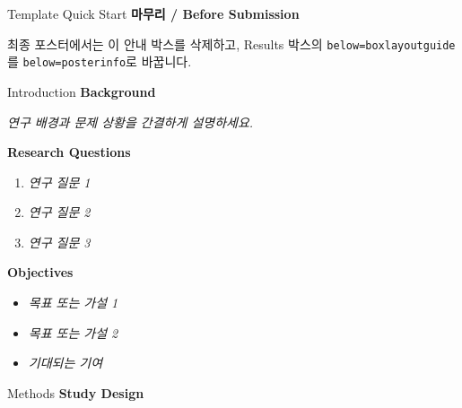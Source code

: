 \documentclass[a0paper,portrait]{KNUE_baposter}
\newcommand{\TemplateText}[1]{{\color{aaublue2}\itshape #1}}
\begin{document}
\begin{poster}
\begin{posterbox}[name=boxlayoutguide,column=1,below=posterinfo]{Template Quick Start}
\vspace{0.25em}
\textbf{마무리 / Before Submission}

최종 포스터에서는 이 안내 박스를 삭제하고, Results 박스의 \texttt{below=boxlayoutguide}를 \texttt{below=posterinfo}로 바꿉니다.
\end{posterbox}

%
\begin{posterbox}[name=introduction,column=0,below=abstract]{Introduction}
\footnotesize
\textbf{Background}

\scriptsize
\TemplateText{연구 배경과 문제 상황을 간결하게 설명하세요.}

\vspace{0.6em}
\footnotesize
\textbf{Research Questions}

\scriptsize
\begin{enumerate}
\item \TemplateText{연구 질문 1}
\item \TemplateText{연구 질문 2}
\item \TemplateText{연구 질문 3}
\end{enumerate}

\vspace{0.6em}
\footnotesize
\textbf{Objectives}

\scriptsize
\begin{itemize}
\item \TemplateText{목표 또는 가설 1}
\item \TemplateText{목표 또는 가설 2}
\item \TemplateText{기대되는 기여}
\end{itemize}
\end{posterbox}

%
\begin{posterbox}[name=methods,column=0,below=introduction]{Methods}
\footnotesize
\textbf{Study Design}


\end{posterbox}
\end{poster}
\end{document}
